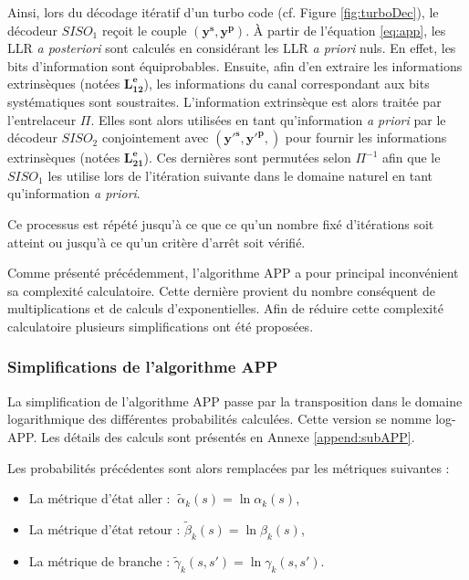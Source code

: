 Ainsi, lors du décodage itératif d'un turbo code (cf. Figure \ref{fig:turboDec}), le décodeur $SISO_1$ reçoit le couple $(\mathbf{y^s},\mathbf{y^p})$. À partir de l'équation \ref{eq:app}, les LLR \textit{a posteriori} sont calculés en considérant les LLR \textit{a priori} nuls. En effet, les bits d'information sont équiprobables. Ensuite, afin d'en extraire les informations extrinsèques (notées $\mathbf{L^e_{12}}$), les informations du canal correspondant aux bits systématiques sont soustraites. L'information extrinsèque est alors traitée par l'entrelaceur $\Pi$. Elles sont alors utilisées en tant qu'information \textit{a priori} par le décodeur $SISO_2$ conjointement avec $(\mathbf{y'^s},\mathbf{y'^p},)$ pour fournir les informations extrinsèques (notées $\mathbf{L^e_{21}}$). Ces dernières sont permutées selon $\Pi^{-1}$ afin que le $SISO_1$ les utilise lors de l'itération suivante dans le domaine naturel en tant qu'information \emph{a priori}. 

Ce processus est répété jusqu'à ce que ce qu'un nombre fixé d'itérations soit atteint ou jusqu'à ce qu'un critère d’arrêt soit vérifié.

Comme présenté précédemment, l'algorithme APP a pour principal inconvénient sa complexité calculatoire. Cette dernière provient du nombre conséquent de multiplications et de calculs d'exponentielles. Afin de réduire cette complexité calculatoire plusieurs simplifications ont été proposées.

\subsubsection{Simplifications de l'algorithme APP}
La simplification de l'algorithme APP passe par la transposition dans le domaine logarithmique des différentes probabilités calculées. Cette version se nomme log-APP. Les détails des calculs sont présentés en Annexe \ref{append:subAPP}.

Les probabilités précédentes sont alors remplacées par les métriques suivantes : 
\begin{itemize}
	\item La métrique d'état aller : $~\tilde{\alpha}_k(s) = \ln \alpha_k(s)$,
	\item La métrique d'état retour : $\tilde{\beta}_k(s) = \ln \beta_k(s)$,
	\item La métrique de branche : $\tilde{\gamma}_k(s, s') = \ln \gamma_k(s, s')$.\\
\end{itemize}

